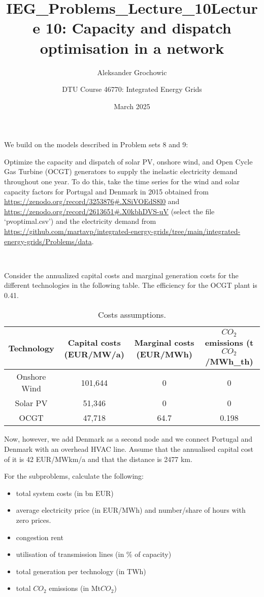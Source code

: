 \documentclass[10pt]{article}
\title{IEG_Problems_Lecture_10}
\author{Aleksander Grochowic}
\date{March 2025}
\newenvironment{problem}[2][Problem]{\begin{trivlist}
\item[\hskip \labelsep {\bfseries #1}\hskip \labelsep {\bfseries #2.}]}{\end{trivlist}}
\begin{document}
 
\title{\textbf{Lecture 10: Capacity and dispatch optimisation in a network}}
\author{
DTU Course 46770: Integrated Energy Grids }
\maketitle

\begin{problem}{10.1}
We build on the models described in Problem sets 8 and 9:

Optimize the capacity and dispatch of solar PV, onshore wind, and Open Cycle Gas Turbine (OCGT) generators to supply the inelastic electricity demand throughout one year. 
To do this, take the time series for the wind and solar capacity factors for Portugal and Denmark in 2015 obtained from \url{https://zenodo.org/record/3253876#.XSiVOEdS8l0}
and \url{https://zenodo.org/record/2613651#.X0kbhDVS-uV} (select the file ‘pvoptimal.csv’) and the electricity demand from \url{https://github.com/martavp/integrated-energy-grids/tree/main/integrated-energy-grids/Problems/data}.

\

Consider the annualized capital costs and marginal generation costs for the different technologies in the following table. The efficiency for the OCGT plant is 0.41.

\begin{table}[h]
	\centering
	\begin{tabular}{cccc}
		\hline
		Technology & Capital costs (EUR/MW/a) & Marginal costs (EUR/MWh) & $CO_2$ emissions (t$CO_2$/MWh_{th}) \\
		\hline
		Onshore Wind &  101,644 & 0 & 0 \\
		Solar PV &  51,346 & 0 & 0 \\
		OCGT & 47,718 &  64.7 & 0.198  \\
		\hline
	\end{tabular}
	\caption{Costs assumptions.}
	\label{tab:my_label}
\end{table}


Now, however, we add Denmark as a second node and we connect Portugal and Denmark with an overhead HVAC line. Assume that the annualised capital cost of it is 42 EUR/MWkm/a and that the distance is 2477 km.

For the subproblems, calculate the following:
\begin{itemize}
	\item total system costs (in bn EUR)
	\item average electricity price (in EUR/MWh) and number/share of hours with zero prices.
	\item congestion rent 
	\item utilisation of transmission lines (in \% of capacity)
	\item total generation per technology (in TWh)
	\item total $CO_2$ emissions (in Mt$CO_2$)
\end{itemize}


\end{problem}
\end{document}
